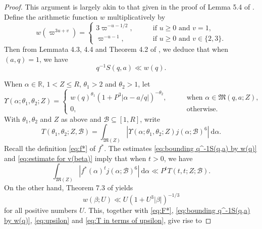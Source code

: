 \documentclass[12pt,english,reqno]{amsart}
\theoremstyle{definition}
\theoremstyle{remark}
\numberwithin{equation}{section}
\numberwithin{equation}{section}
\numberwithin{figure}{section}
\theoremstyle{plain}
\theoremstyle{plain}
\theoremstyle{plain}
\theoremstyle{plain}
\numberwithin{equation}{section}
\numberwithin{thm}{section}
\begin{document}
\begin{proof}
This argument is largely akin to that given in the proof of Lemma
5.4 of \cite{VaughanWooley2000}. Define the arithmetic function $w$
multiplicatively by
\begin{equation}
w(\varpi^{3u+v})=\begin{cases}
3\varpi^{-u-1/2},\qquad & \text{if }u\geq0\text{ and }v=1,\\
\varpi^{-u-1}, & \text{if }u\geq0\text{ and }v\in\{2,3\}.\end{cases}\label{eq:arithmetic function w}\end{equation}
Then from Lemmata 4.3, 4.4 and Theorem 4.2 of \cite{vaughan1997},
we deduce that when $(a,q)=1$, we have
\begin{equation}
q^{-1}S(q,a)\ll w(q).\label{eq:bounding q^-1S(q,a) by w(q)}\end{equation}
\par When $\alpha\in\mathbb{R}$, $1<Z\leq R$, $\theta_1>2$ and $\theta_2>1$, let
\begin{equation}
\Upsilon(\alpha;\theta_1,\theta_2;Z)=\begin{cases}
w(q)^{\theta_1}(1+P^{3}|\alpha-a/q|)^{-\theta_2},\qquad & \text{when }\alpha\in\mathfrak{M}(q,a;Z),\\
0, & \text{otherwise.}\end{cases}\label{eq:upsilon}\end{equation}
With $\theta_1,\theta_2$ and $Z$ as above and $\mathcal{B}\subseteq[1,R]$, write
\begin{equation}
T(\theta_1,\theta_2;Z,\mathcal{B})=\int_{\mathfrak{M}(Z)}|\Upsilon(\alpha;\theta_1,\theta_2;Z)j(\alpha;\mathcal{B})^{6}|\:\mathrm{d}\alpha.\label{eq:T in terms of upsilon}\end{equation}
Recall the definition \eqref{eq:f*} of $f^{*}$. The estimates \eqref{eq:bounding q^-1S(q,a) by w(q)}
and \eqref{eq:estimate for v(beta)} imply that when $t>0$, we have
\begin{equation}
\int_{\mathfrak{M}(Z)}|f^{*}(\alpha)^tj(\alpha;\mathcal{B})^{6}|\:\mathrm{d}\alpha\ll P^tT(t,t;Z;\mathcal{B}).\label{eq:integral of f*h in terms of upsilon}\end{equation}
On the other hand, Theorem 7.3 of \cite{vaughan1997} yields
\begin{equation}
w(\beta;U)\ll U(1+U^{3}|\beta|)^{-1/3}\label{eq:estimate for w_0}\end{equation}
for all positive numbers $U$. This, together with \eqref{eq:F*}, \eqref{eq:bounding q^-1S(q,a) by w(q)}, \eqref{eq:upsilon} and \eqref{eq:T in terms of upsilon}, give rise to

\end{proof}
\end{document}
